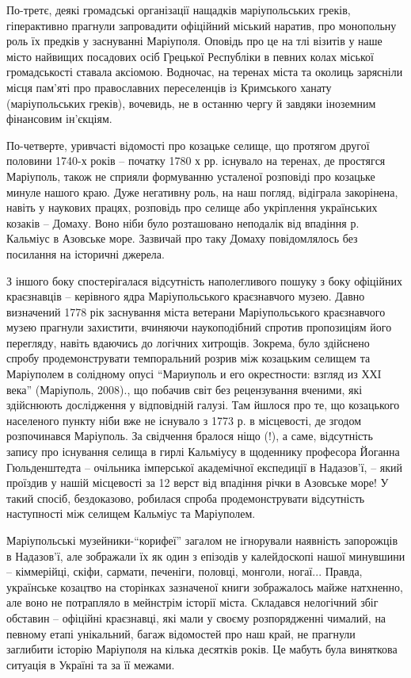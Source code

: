 По-третє, деякі громадські організації нащадків маріупольських греків,
гіперактивно прагнули запровадити офіційний міський наратив, про монопольну
роль їх предків у заснуванні Маріуполя. Оповідь про це на тлі   візитів у наше
місто найвищих посадових осіб Грецької Республіки в певних колах міської
громадськості  ставала аксіомою. Водночас, на теренах міста та околиць
зарясніли місця пам'яті про православних переселенців із Кримського ханату
(маріупольських греків), вочевидь, не в останню чергу й завдяки іноземним
фінансовим ін'єкціям.

По-четверте, уривчасті відомості про козацьке селище, що протягом другої
половини 1740-х років – початку 1780 х рр. існувало на теренах, де простягся
Маріуполь, також не сприяли формуванню усталеної розповіді про козацьке минуле
нашого краю. Дуже негативну роль, на наш погляд, відіграла закорінена, навіть у
наукових працях, розповідь про селище або укріплення українських козаків –
Домаху. Воно ніби було розташовано неподалік від впадіння р. Кальміус в
Азовське море. Зазвичай про таку Домаху повідомлялось без посилання на
історичні джерела.

З іншого боку спостерігалася відсутність наполегливого пошуку з боку офіційних
краєзнавців – керівного ядра Маріупольського краєзнавчого музею. Давно
визначений 1778 рік заснування міста ветерани Маріупольського краєзнавчого
музею прагнули захистити, вчиняючи наукоподібний спротив пропозиціям його
перегляду, навіть вдаючись до логічних хитрощів. Зокрема, було здійснено спробу
продемонструвати темпоральний розрив між козацьким селищем та Маріуполем в
солідному опусі \enquote{Мариуполь и его окрестности: взгляд из ХХI века} (Маріуполь,
2008)., що побачив світ без рецензування вченими, які здійснюють дослідження у
відповідній галузі. Там йшлося про те, що козацького населеного пункту ніби вже
не існувало з 1773 р. в місцевості, де згодом розпочинався Маріуполь. За
свідчення бралося ніщо (!), а саме, відсутність запису про існування селища в
гирлі Кальміусу в щоденнику професора Йоганна Гюльденштедта – очільника
імперської академічної експедиції в Надазов'ї, – який проїздив у нашій
місцевості за 12 верст від впадіння річки в Азовське море! У такий спосіб,
бездоказово, робилася спроба продемонструвати відсутність наступності  між
селищем Кальміус та Маріуполем.


Маріупольські музейники-\enquote{корифеї} загалом не ігнорували наявність запорожців в
Надазов'ї, але зображали їх як один з епізодів у калейдоскопі нашої минувшини –
кіммерійці, скіфи, сармати, печеніги, половці, монголи, ногаї... Правда,
українське козацтво на сторінках зазначеної книги зображалось майже натхненно,
але воно не потрапляло в мейнстрім історії міста. Складався нелогічний збіг
обставин – офіційні краєзнавці, які мали у своєму розпорядженні чималий, на
певному етапі унікальний, багаж відомостей про наш край, не прагнули заглибити
історію Маріуполя на кілька десятків років. Це мабуть була виняткова ситуація в
Україні та за її межами.

